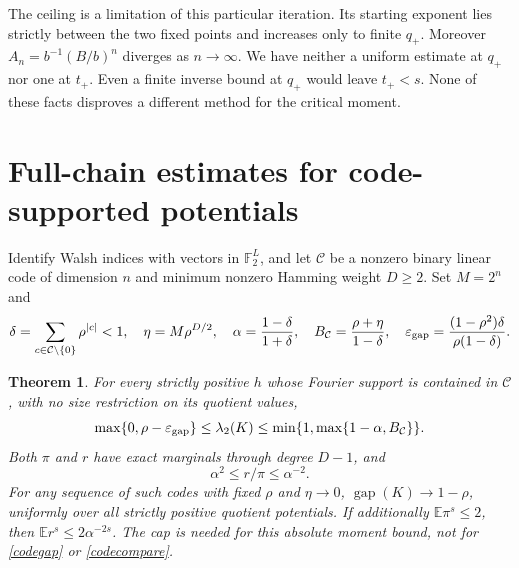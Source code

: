 \documentclass[11pt]{article}
\newcommand{\E}{\mathbb E}
\newcommand{\F}{\mathbb F}
\newtheorem{theorem}{Theorem}[section]
\begin{document}
The ceiling is a limitation of this particular iteration. Its starting exponent lies strictly between the two fixed points and increases only to finite $q_+$. Moreover $A_n=b^{-1}(B/b)^n$ diverges as $n\to\infty$. We have neither a uniform estimate at $q_+$ nor one at $t_+$. Even a finite inverse bound at $q_+$ would leave $t_+<s$. None of these facts disproves a different method for the critical moment.

\section{Full-chain estimates for code-supported potentials}
Identify Walsh indices with vectors in $\F_2^L$, and let $\mathcal C$ be a nonzero binary linear code of dimension $n$ and minimum nonzero Hamming weight $D\geq2$. Set $M=2^n$ and
\[
 \delta=\sum_{c\in\mathcal C\setminus\{0\}}\rho^{|c|}<1,
 \quad \eta=M\rho^{D/2},\quad \alpha=\frac{1-\delta}{1+\delta},
 \quad B_{\mathcal C}=\frac{\rho+\eta}{1-\delta},\quad
 \varepsilon_{\rm gap}=\frac{(1-\rho^2)\delta}{\rho(1-\delta)}.
\]
\begin{theorem}\label{codetheorem}
For every strictly positive $h$ whose Fourier support is contained in $\mathcal C$, with no size restriction on its quotient values,
\begin{equation}\label{codegap}
 \max\{0,\rho-\varepsilon_{\rm gap}\}\leq\lambda_2(K)
 \leq\min\{1,\max\{1-\alpha,B_{\mathcal C}\}\}.
\end{equation}
Both $\pi$ and $r$ have exact marginals through degree $D-1$, and
\begin{equation}\label{codecompare}
 \alpha^2\leq r/\pi\leq\alpha^{-2}.
\end{equation}
For any sequence of such codes with fixed $\rho$ and $\eta\to0$,
$\operatorname{gap}(K)\to1-\rho$, uniformly over all strictly positive quotient potentials. If additionally $\E\pi^s\leq2$, then $\E r^s\leq2\alpha^{-2s}$. The cap is needed for this absolute moment bound, not for \eqref{codegap} or \eqref{codecompare}.
\end{theorem}
\end{document}
